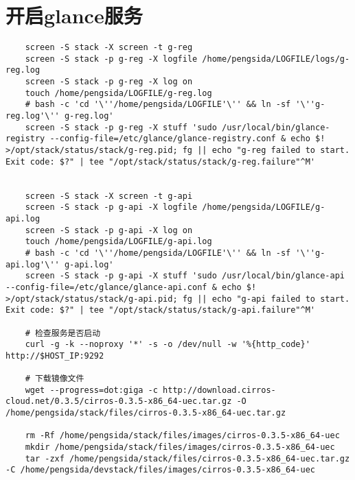 \documentclass[a4paper,left=1.5cm,right=1.5cm,11pt]{article}
\begin{document}
\section{开启glance服务}
	\begin{lstlisting}
	screen -S stack -X screen -t g-reg
	screen -S stack -p g-reg -X logfile /home/pengsida/LOGFILE/logs/g-reg.log
    screen -S stack -p g-reg -X log on
	touch /home/pengsida/LOGFILE/g-reg.log
    # bash -c 'cd '\''/home/pengsida/LOGFILE'\'' && ln -sf '\''g-reg.log'\'' g-reg.log'
	screen -S stack -p g-reg -X stuff 'sudo /usr/local/bin/glance-registry --config-file=/etc/glance/glance-registry.conf & echo $! >/opt/stack/status/stack/g-reg.pid; fg || echo "g-reg failed to start. Exit code: $?" | tee "/opt/stack/status/stack/g-reg.failure"^M'

	
	screen -S stack -X screen -t g-api
	screen -S stack -p g-api -X logfile /home/pengsida/LOGFILE/g-api.log
    screen -S stack -p g-api -X log on
	touch /home/pengsida/LOGFILE/g-api.log
    # bash -c 'cd '\''/home/pengsida/LOGFILE'\'' && ln -sf '\''g-api.log'\'' g-api.log'
	screen -S stack -p g-api -X stuff 'sudo /usr/local/bin/glance-api --config-file=/etc/glance/glance-api.conf & echo $! >/opt/stack/status/stack/g-api.pid; fg || echo "g-api failed to start. Exit code: $?" | tee "/opt/stack/status/stack/g-api.failure"^M'

	# 检查服务是否启动
	curl -g -k --noproxy '*' -s -o /dev/null -w '%{http_code}' http://$HOST_IP:9292

	# 下载镜像文件
	wget --progress=dot:giga -c http://download.cirros-cloud.net/0.3.5/cirros-0.3.5-x86_64-uec.tar.gz -O /home/pengsida/stack/files/cirros-0.3.5-x86_64-uec.tar.gz

	rm -Rf /home/pengsida/stack/files/images/cirros-0.3.5-x86_64-uec
	mkdir /home/pengsida/stack/files/images/cirros-0.3.5-x86_64-uec
    tar -zxf /home/pengsida/stack/files/cirros-0.3.5-x86_64-uec.tar.gz -C /home/pengsida/devstack/files/images/cirros-0.3.5-x86_64-uec


\end{lstlisting}
\end{document}
